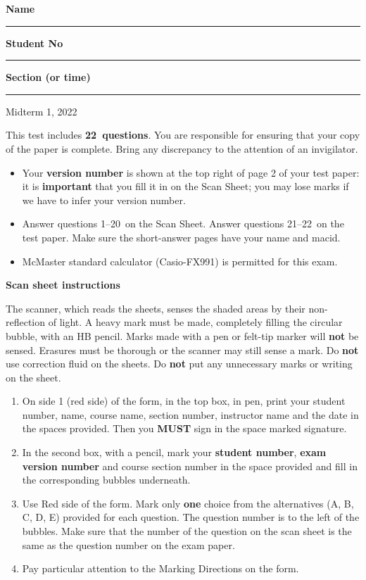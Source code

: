 \documentclass[12pt]{article}
\def\midterm{1}
\def\year{2022}
\def\questions{22}
\def\mc{1--20}
\def\saq{questions 21--22}
\begin{document}
\noindent \textbf{Name} \rule{5cm}{1pt} \hfill \textbf{Student No} \rule{5cm}{1pt}

\noindent
\textbf{Section (or time)} \rule{5cm}{1pt}

\bigskip

{ \par}
{\centering Midterm \midterm, \year\par}

\parindent0pt

\vfill

This test includes {\bf \questions\ questions}. You are responsible for ensuring that your copy of the paper is complete. Bring any discrepancy to the attention of an invigilator. 

\vfill

\begin{itemize}
\item Your \textbf{version number} is shown at the top right of page 2 of your test paper: it is \textbf{important} that you fill it in on the Scan Sheet; you may lose marks if we have to infer your version number.
\item Answer questions \mc\ on the Scan Sheet. Answer \saq\ on the test paper. Make sure the short-answer pages have your name and macid.
\item McMaster standard calculator (Casio-FX991) is permitted for this exam.
\end{itemize}

\vfill

\textbf{Scan sheet instructions}

\small{
The scanner, which reads the sheets, senses the shaded areas by their non-reflection of light. A heavy mark must be made, completely filling the circular bubble, with an HB pencil. Marks made with a pen or felt-tip marker will \textbf{not} be sensed. Erasures must be thorough or the scanner may still sense a mark. Do \textbf{not} use correction fluid on the sheets. Do \textbf{not} put any unnecessary marks or writing on the sheet.

\begin{enumerate}
\item On side 1 (red side) of the form, in the top box, in pen, print your student number, name, course name, section number, instructor name and the date in the spaces provided. Then you {\bf MUST} sign in the space marked signature.

\item In the second box, with a pencil, mark your {\bf student number}, {\bf exam version number} and course section number in the space provided and fill in the corresponding bubbles underneath.

\item Use Red side of the form. Mark only {\bf one} choice from the alternatives (A, B, C, D, E) provided for each question. The question number is to the left of the bubbles. Make sure that the number of the question on the scan sheet is the same as the question number on the exam paper.
\item  Pay particular attention to the Marking Directions on the form.
\end{enumerate}
}

\vfill
{ \par}
\end{document}
